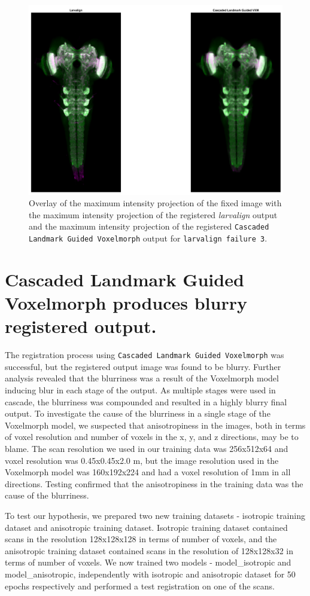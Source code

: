 \documentclass{book}
\begin{document}
	\begin{figure}[h!]
		\centering
		\includegraphics[width=0.7\columnwidth]{resources/chapter7/LRE_Visual/60a07.png}
		\caption{Overlay of the maximum intensity projection of the fixed image with the maximum intensity projection of the registered \textit{larvalign} output and the maximum intensity projection of the registered \texttt{Cascaded Landmark Guided Voxelmorph} output for \texttt{larvalign failure 3}.}
		\label{fig:larvalign failure 3}
	\end{figure}
	
	\section{Cascaded Landmark Guided Voxelmorph produces blurry registered output.}
	The registration process using \texttt{Cascaded Landmark Guided Voxelmorph} was successful, but the registered output image was found to be blurry. Further analysis revealed that the blurriness was a result of the Voxelmorph model inducing blur in each stage of the output. As multiple stages were used in cascade, the blurriness was compounded and resulted in a highly blurry final output. To investigate the cause of the blurriness in a single stage of the Voxelmorph model, we suspected that anisotropiness in the images, both in terms of voxel resolution and number of voxels in the x, y, and z directions, may be to blame. The scan resolution we used in our training data was 256x512x64 and voxel resolution was 0.45x0.45x2.0 \textmu m, but the image resolution used in the Voxelmorph model was 160x192x224 and had a voxel resolution of 1mm in all directions. Testing confirmed that the anisotropiness in the training data was the cause of the blurriness.
	
	To test our hypothesis, we prepared two new training datasets - isotropic training dataset and anisotropic training dataset. Isotropic training dataset contained scans in the resolution 128x128x128 in terms of number of voxels, and the anisotropic training dataset contained scans in the resolution of 128x128x32 in terms of number of voxels. We now trained two models - model\_isotropic and model\_anisotropic, independently with isotropic and anisotropic dataset for 50 epochs respectively and performed a test registration on one of the scans.
	
\end{document}
